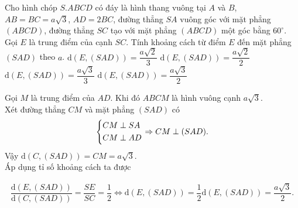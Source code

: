 \begin{ex}%
 Cho hình chóp $S.ABCD$ có đáy là hình thang vuông tại $A$ và $B$, $AB = BC = a\sqrt{3}$, $AD = 2BC$, đường thẳng $SA$ vuông góc với mặt phẳng $(ABCD)$, đường thẳng $SC$ tạo với mặt phẳng $(ABCD)$ một góc bằng $60^\circ$. Gọi $E$ là trung điểm của cạnh $SC$. Tính khoảng cách từ điểm $E$ đến mặt phẳng $(SAD)$ theo $a$.
 \choice
  {$\mathrm{d}(E,(SAD)) = \dfrac{a\sqrt{2}}{3}$}
  {$\mathrm{d}(E,(SAD)) = \dfrac{a\sqrt{2}}{2}$}
  {$\mathrm{d}(E,(SAD)) = \dfrac{a\sqrt{3}}{3}$}
  {\True $\mathrm{d}(E,(SAD)) = \dfrac{a\sqrt{3}}{2}$}
 \loigiai
  {
  \immini
  {
  Gọi $M$ là trung điểm của $AD$. Khi đó $ABCM$ là hình vuông cạnh $a\sqrt{3}$.\\
  Xét đường thẳng $CM$ và mặt phẳng $(SAD)$ có
  \begin{eqnarray*}
   \left\{\begin{aligned}& CM \perp SA \\& CM \perp AD\end{aligned}\right. \Rightarrow CM \perp (SAD).
  \end{eqnarray*}
  Vậy $\mathrm{d}(C,(SAD)) = CM = a\sqrt{3}$.\\
  Áp dụng tỉ số khoảng cách ta được
  }
  {
  }
  \noindent
  \begin{eqnarray*}
   \dfrac{\mathrm{d}(E,(SAD))}{\mathrm{d}(C,(SAD))} = \dfrac{SE}{SC} = \dfrac{1}{2} \Leftrightarrow \mathrm{d}(E,(SAD)) = \dfrac{1}{2}\mathrm{d}(E,(SAD)) = \dfrac{a\sqrt{3}}{2}.
  \end{eqnarray*}
  }
\end{ex}

